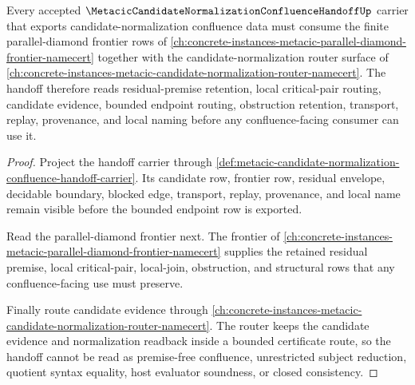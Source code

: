 \begin{theorem}
\label{thm:metacic-candidate-normalization-confluence-handoff-parallel-diamond-sibling-dependency}
Every accepted $\MetacicCandidateNormalizationConfluenceHandoffUp$ carrier that exports candidate-normalization confluence data must consume the finite parallel-diamond frontier rows of \autoref{ch:concrete-instances-metacic-parallel-diamond-frontier-namecert} together with the candidate-normalization router surface of \autoref{ch:concrete-instances-metacic-candidate-normalization-router-namecert}. The handoff therefore reads residual-premise retention, local critical-pair routing, candidate evidence, bounded endpoint routing, obstruction retention, transport, replay, provenance, and local naming before any confluence-facing consumer can use it.
\end{theorem}
\begin{proof}
Project the handoff carrier through \autoref{def:metacic-candidate-normalization-confluence-handoff-carrier}. Its candidate row, frontier row, residual envelope, decidable boundary, blocked edge, transport, replay, provenance, and local name remain visible before the bounded endpoint row is exported.

Read the parallel-diamond frontier next. The frontier of \autoref{ch:concrete-instances-metacic-parallel-diamond-frontier-namecert} supplies the retained residual premise, local critical-pair, local-join, obstruction, and structural rows that any confluence-facing use must preserve.

Finally route candidate evidence through \autoref{ch:concrete-instances-metacic-candidate-normalization-router-namecert}. The router keeps the candidate evidence and normalization readback inside a bounded certificate route, so the handoff cannot be read as premise-free confluence, unrestricted subject reduction, quotient syntax equality, host evaluator soundness, or closed consistency.
\end{proof}
